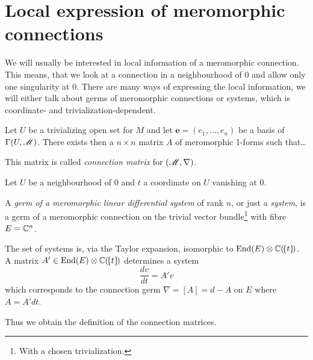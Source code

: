 \section{Local expression of meromorphic connections}
\begin{comment}
  \begin{itemize}
    \item \cite{sabbah2007isomonodromic} p.28
    \item \cite{thboalch} p.2
    \item \cite{babbitt1989local} p. 11
  \end{itemize}
\end{comment}
We will usually be interested in local information of a meromorphic connection.
This means, that we look at a connection in a neighbourhood of $0$ and  allow
only one singularity at $0$.
There are many ways of expressing the local information, we will either talk
about germs of meromorphic connections or systems, which is coordinate-
and trivialization-dependent.

\begin{paracol}{2}\sloppy
\switchcolumn[0]\noindent
  Let $U$ be a trivializing open set for $M$ and let
  $\textbf{e}=(e_1,\dots,e_n)$ be a basis of $\Gamma(U,\mathscr{M})$.
  There exists then a $n\times n$ matrix $A$ of meromorphic 1-forms such
  that\dots
  \begin{defn}
    This matrix is called \emph{connection matrix} for $(\mathscr{M},\nabla)$.
  \end{defn}
\switchcolumn[1]\noindent
  Let $U$ be a neighbourhood of $0$ and $t$ a coordinate on $U$ vanishing at
  $0$.
\end{paracol}

\begin{comment}
  Some Literature like \cite{sabbah_cimpa90} always talks about germs\dots
\end{comment}
\begin{defn}
  A \emph{germ of a meromorphic linear differential system} of rank $n$, or
  just a \emph{system}, is a germ of a meromorphic connection on the trivial
  vector bundle\footnote{With a chosen trivialization.} with fibre $E=\mathbb{C}^n$.
\end{defn}
The set of systems is, via the Taylor expansion, isomorphic to
$\operatorname{End}(E)\otimes\mathbb{C}(\!\{t\}\!)$. A matrix
$A'\in\operatorname{End}(E)\otimes\mathbb{C}(\!\{t\}\!)$ determines a system
\[
  \frac{dv}{dt}=A'v
\]
which corresponds to the connection germ $\nabla=[A]=d-A$ on $E$ where
$A=A'dt$.
\begin{paracol}{2}\sloppy
\switchcolumn[1]\noindent
  Thus we obtain the definition of the connection matrices.
\end{paracol}
\begin{comment}
  \cite{boalch} wants \textbf{generic} meromorphic connections
  \begin{itemize}
    \item\dots simplest jet sufficient\dots
  \end{itemize}
\end{comment}

